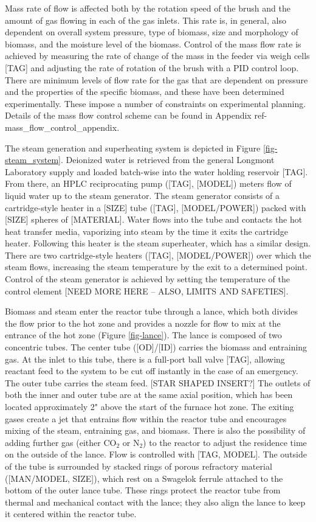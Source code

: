\documentclass[11pt,twocolumn]{article}
\begin{document}
Mass rate of flow is affected both by the rotation speed of the brush and the amount of gas flowing in each of the gas inlets.  This rate is, in general, also dependent on overall system pressure, type of biomass, size and morphology of biomass, and the moisture level of the biomass.  Control of the mass flow rate is achieved by measuring the rate of change of the mass in the feeder via weigh cells [TAG] and adjusting the rate of rotation of the brush with a PID control loop.  There are minimum levels of flow rate for the gas that are dependent on pressure and the properties of the specific biomass, and these have been determined experimentally.  These impose a number of constraints on experimental planning.  Details of the mass flow control scheme can be found in Appendix {ref-mass_flow_control_appendix}.  

The steam generation and superheating system is depicted in Figure \ref{fig-steam_system}.  Deionized water is retrieved from the general Longmont Laboratory supply and loaded batch-wise into the water holding reservoir [TAG].  From there, an HPLC reciprocating pump ([TAG], [MODEL]) meters flow of liquid water up to the steam generator.  The steam generator consists of a cartridge-style heater in a [SIZE] tube ([TAG], [MODEL/POWER]) packed with [SIZE] spheres of [MATERIAL].  Water flows into the tube and contacts the hot heat transfer media, vaporizing into steam by the time it exits the cartridge heater.  Following this heater is the steam superheater, which has a similar design.  There are two cartridge-style heaters ([TAG], [MODEL/POWER]) over which the steam flows, increasing the steam temperature by the exit to a determined point.  Control of the steam generator is achieved by setting the temperature of the control element [NEED MORE HERE -- ALSO, LIMITS AND SAFETIES].

Biomass and steam enter the reactor tube through a lance, which both divides the flow prior to the hot zone and provides a nozzle for flow to mix at the entrance of the hot zone (Figure \ref{fig-lance}).  The lance is composed of two concentric tubes.  The center tube ([OD]/[ID]) carries the biomass and entraining gas.  At the inlet to this tube, there is a full-port ball valve [TAG], allowing reactant feed to the system to be cut off instantly in the case of an emergency.  The outer tube carries the steam feed.  [STAR SHAPED INSERT?]  The outlets of both the inner and outer tube are at the same axial position, which has been located approximately 2" above the start of the furnace hot zone.  The exiting gases create a jet that entrains flow within the reactor tube and encourages mixing of the steam, entraining gas, and biomass.  There is also the possibility of adding further gas (either CO$_2$ or N$_2$) to the reactor to adjust the residence time on the outside of the lance.  Flow is controlled with [TAG, MODEL].  The outside of the tube is surrounded by stacked rings of porous refractory material ([MAN/MODEL, SIZE]), which rest on a Swagelok ferrule attached to the bottom of the outer lance tube.  These rings protect the reactor tube from thermal and mechanical contact with the lance; they also align the lance to keep it centered within the reactor tube.
\end{document}
